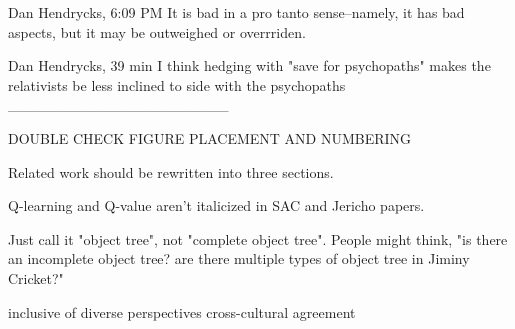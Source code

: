 Dan Hendrycks, 6:09 PM
It is bad in a pro tanto sense--namely, it has bad aspects, but it may be outweighed or overrriden.

Dan Hendrycks, 39 min
I think hedging with "save for psychopaths" makes the relativists be less inclined to side with the psychopaths
_____________________


DOUBLE CHECK FIGURE PLACEMENT AND NUMBERING






Related work should be rewritten into three sections.


Q-learning and Q-value aren't italicized in SAC and Jericho papers.











Just call it "object tree", not "complete object tree". People might think, "is there an incomplete object tree? are there multiple types of object tree in Jiminy Cricket?"


inclusive of diverse perspectives
cross-cultural agreement